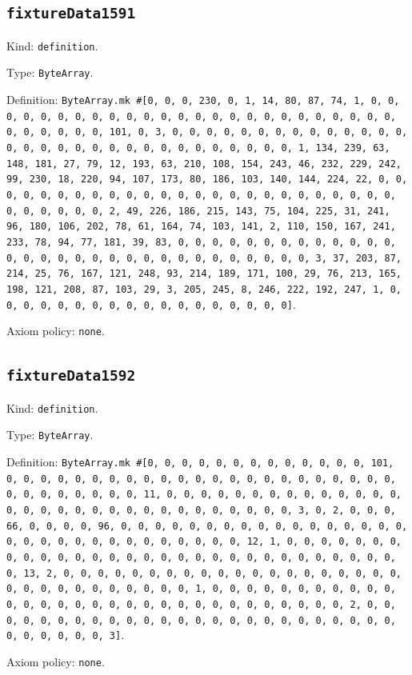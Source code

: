 \documentclass[11pt]{article}
\begin{document}
\subsection*{\texttt{fixtureData1591}}
\noindent Kind: \texttt{definition}.\par
\noindent Type: \texttt{ByteArray}.\par
\noindent Definition: \texttt{ByteArray.mk \#[0, 0, 0, 230, 0, 1, 14, 80, 87, 74, 1, 0, 0, 0, 0, 0, 0, 0, 0, 0, 0, 0, 0, 0, 0, 0, 0, 0, 0, 0, 0, 0, 0, 0, 0, 0, 0, 0, 0, 0, 0, 0, 101, 0, 3, 0, 0, 0, 0, 0, 0, 0, 0, 0, 0, 0, 0, 0, 0, 0, 0, 0, 0, 0, 0, 0, 0, 0, 0, 0, 0, 0, 0, 0, 0, 0, 1, 134, 239, 63, 148, 181, 27, 79, 12, 193, 63, 210, 108, 154, 243, 46, 232, 229, 242, 99, 230, 18, 220, 94, 107, 173, 80, 186, 103, 140, 144, 224, 22, 0, 0, 0, 0, 0, 0, 0, 0, 0, 0, 0, 0, 0, 0, 0, 0, 0, 0, 0, 0, 0, 0, 0, 0, 0, 0, 0, 0, 0, 0, 0, 2, 49, 226, 186, 215, 143, 75, 104, 225, 31, 241, 96, 180, 106, 202, 78, 61, 164, 74, 103, 141, 2, 110, 150, 167, 241, 233, 78, 94, 77, 181, 39, 83, 0, 0, 0, 0, 0, 0, 0, 0, 0, 0, 0, 0, 0, 0, 0, 0, 0, 0, 0, 0, 0, 0, 0, 0, 0, 0, 0, 0, 0, 0, 0, 3, 37, 203, 87, 214, 25, 76, 167, 121, 248, 93, 214, 189, 171, 100, 29, 76, 213, 165, 198, 121, 208, 87, 103, 29, 3, 205, 245, 8, 246, 222, 192, 247, 1, 0, 0, 0, 0, 0, 0, 0, 0, 0, 0, 0, 0, 0, 0, 0, 0, 0, 0]}.\par
\noindent Axiom policy: \texttt{none}.\par
\subsection*{\texttt{fixtureData1592}}
\noindent Kind: \texttt{definition}.\par
\noindent Type: \texttt{ByteArray}.\par
\noindent Definition: \texttt{ByteArray.mk \#[0, 0, 0, 0, 0, 0, 0, 0, 0, 0, 0, 0, 0, 101, 0, 0, 0, 0, 0, 0, 0, 0, 0, 0, 0, 0, 0, 0, 0, 0, 0, 0, 0, 0, 0, 0, 0, 0, 0, 0, 0, 0, 0, 0, 0, 11, 0, 0, 0, 0, 0, 0, 0, 0, 0, 0, 0, 0, 0, 0, 0, 0, 0, 0, 0, 0, 0, 0, 0, 0, 0, 0, 0, 0, 0, 0, 0, 3, 0, 2, 0, 0, 0, 66, 0, 0, 0, 0, 96, 0, 0, 0, 0, 0, 0, 0, 0, 0, 0, 0, 0, 0, 0, 0, 0, 0, 0, 0, 0, 0, 0, 0, 0, 0, 0, 0, 0, 0, 0, 0, 12, 1, 0, 0, 0, 0, 0, 0, 0, 0, 0, 0, 0, 0, 0, 0, 0, 0, 0, 0, 0, 0, 0, 0, 0, 0, 0, 0, 0, 0, 0, 0, 0, 13, 2, 0, 0, 0, 0, 0, 0, 0, 0, 0, 0, 0, 0, 0, 0, 0, 0, 0, 0, 0, 0, 0, 0, 0, 0, 0, 0, 0, 0, 0, 0, 0, 1, 0, 0, 0, 0, 0, 0, 0, 0, 0, 0, 0, 0, 0, 0, 0, 0, 0, 0, 0, 0, 0, 0, 0, 0, 0, 0, 0, 0, 0, 0, 0, 2, 0, 0, 0, 0, 0, 0, 0, 0, 0, 0, 0, 0, 0, 0, 0, 0, 0, 0, 0, 0, 0, 0, 0, 0, 0, 0, 0, 0, 0, 0, 0, 3]}.\par
\noindent Axiom policy: \texttt{none}.\par
\end{document}
